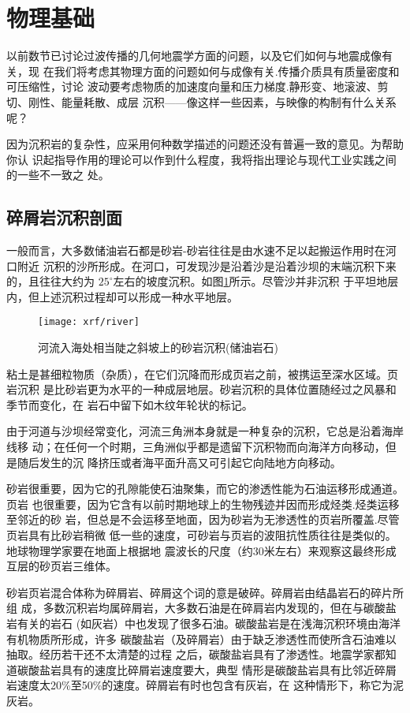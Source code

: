 \section{物理基础}
以前数节已讨论过波传播的几何地震学方面的问题，以及它们如何与地震成像有关，现
在我们将考虑其物理方面的问题如何与成像有关.传播介质具有质量密度和可压缩性，讨论
波动要考虑物质的加速度向量和压力梯度.静形变、地滚波、剪切、刚性、能量耗散、成层
沉积——像这样一些因素，与映像的构制有什么关系呢？

因为沉积岩的复杂性，应采用何种数学描述的问题还没有普遍一致的意见。为帮助你认
识起指导作用的理论可以作到什么程度，我将指出理论与现代工业实践之间的一些不一致之
处。

\subsection{碎屑岩沉积剖面}
一般而言，大多数储油岩石都是砂岩-砂岩往往是由水速不足以起搬运作用时在河口附近
沉积的沙所形成。在河口，可发现沙是沿着沙是沿着沙坝的末端沉积下来的，且往往大约为
$25^{\circ}$左右的坡度沉积。如图\ref{fig:xrf/river}所示。尽管沙并非沉积
于平坦地层内，但上述沉积过程却可以形成一种水平地层。
\begin{figure}[H]
\centering
\texttt{[image: xrf/river]}
\caption[river]{河流入海处相当陡之斜坡上的砂岩沉积(储油岩石)}
\label{fig:xrf/river}
\end{figure}
粘土是甚细粒物质（杂质），在它们沉降而形成页岩之前，被携运至深水区域。页岩沉积
是比砂岩更为水平的一种成层地层。砂岩沉积的具体位置随经过之风暴和季节而变化，在
岩石中留下如木纹年轮状的标记。

由于河道与沙坝经常变化，河流三角洲本身就是一种复杂的沉积，它总是沿着海岸线移
动；在任何一个时期，三角洲似乎都是遗留下沉积物而向海洋方向移动，但是随后发生的沉
降挤压或者海平面升高又可引起它向陆地方向移动。


砂岩很重要，因为它的孔隙能使石油聚集，而它的渗透性能为石油运移形成通道。页岩
也很重要，因为它含有以前时期地球上的生物残迹并因而形成烃类.烃类运移至邻近的砂
岩，但总是不会运移至地面，因为砂岩为无渗透性的页岩所覆盖.尽管页岩具有比砂岩稍微
低一些的速度，可砂岩与页岩的波阻抗性质往往是类似的。地球物理学家要在地面上根据地
震波长的尺度（约30米左右）来观察这最终形成互层的砂页岩三维体。

砂岩页岩混合体称为碎屑岩、碎屑这个词的意是破碎。碎屑岩由结晶岩石的碎片所组
成，多数沉积岩均属碎屑岩，大多数石油是在碎肩岩内发现的，但在与碳酸盐岩有关的岩石
(如灰岩）中也发现了很多石油。碳酸盐岩是在浅海沉积环境由海洋有机物质所形成，许多
碳酸盐岩（及碎屑岩）由于缺乏渗透性而使所含石油难以抽取。经历若干还不太清楚的过程
之后，碳酸盐岩具有了渗透性。地震学家都知道碳酸盐岩具有的速度比碎屑岩速度要大，典型
情形是碳酸盐岩具有比邻近碎屑岩速度太20\%至50\%的速度。碎屑岩有时也包含有灰岩，在
这种情形下，称它为泥灰岩。

